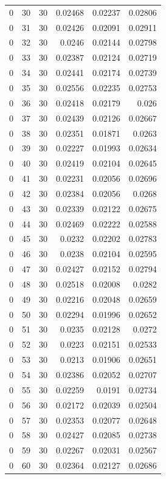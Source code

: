 \begin{tabular}{rrrrrr}
0 & 30 & 30 & 0.02468 & 0.02237 & 0.02806 \\
0 & 31 & 30 & 0.02426 & 0.02091 & 0.02911 \\
0 & 32 & 30 & 0.0246 & 0.02144 & 0.02798 \\
0 & 33 & 30 & 0.02387 & 0.02124 & 0.02719 \\
0 & 34 & 30 & 0.02441 & 0.02174 & 0.02739 \\
0 & 35 & 30 & 0.02556 & 0.02235 & 0.02753 \\
0 & 36 & 30 & 0.02418 & 0.02179 & 0.026 \\
0 & 37 & 30 & 0.02439 & 0.02126 & 0.02667 \\
0 & 38 & 30 & 0.02351 & 0.01871 & 0.0263 \\
0 & 39 & 30 & 0.02227 & 0.01993 & 0.02634 \\
0 & 40 & 30 & 0.02419 & 0.02104 & 0.02645 \\
0 & 41 & 30 & 0.02231 & 0.02056 & 0.02696 \\
0 & 42 & 30 & 0.02384 & 0.02056 & 0.0268 \\
0 & 43 & 30 & 0.02339 & 0.02122 & 0.02675 \\
0 & 44 & 30 & 0.02469 & 0.02222 & 0.02588 \\
0 & 45 & 30 & 0.0232 & 0.02202 & 0.02783 \\
0 & 46 & 30 & 0.0238 & 0.02104 & 0.02595 \\
0 & 47 & 30 & 0.02427 & 0.02152 & 0.02794 \\
0 & 48 & 30 & 0.02518 & 0.02008 & 0.0282 \\
0 & 49 & 30 & 0.02216 & 0.02048 & 0.02659 \\
0 & 50 & 30 & 0.02294 & 0.01996 & 0.02652 \\
0 & 51 & 30 & 0.0235 & 0.02128 & 0.0272 \\
0 & 52 & 30 & 0.0223 & 0.02151 & 0.02533 \\
0 & 53 & 30 & 0.0213 & 0.01906 & 0.02651 \\
0 & 54 & 30 & 0.02386 & 0.02052 & 0.02707 \\
0 & 55 & 30 & 0.02259 & 0.0191 & 0.02734 \\
0 & 56 & 30 & 0.02172 & 0.02039 & 0.02504 \\
0 & 57 & 30 & 0.02353 & 0.02077 & 0.02648 \\
0 & 58 & 30 & 0.02427 & 0.02085 & 0.02738 \\
0 & 59 & 30 & 0.02267 & 0.02031 & 0.02567 \\
0 & 60 & 30 & 0.02364 & 0.02127 & 0.02686 \\

\end{tabular}
